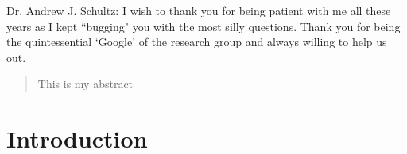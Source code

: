 \documentclass[10pt]{ubthesis}
\begin{document}
\begin{ubfrontmatter}
\begin{acknowledgements}
    \noindent Dr. Andrew J. Schultz: I wish to thank you for being patient with me all these years as I kept ``bugging" you with the most silly questions. Thank you for being the quintessential `Google' of the research group and always willing to help us out. 
\end{acknowledgements}
\tableofcontents
\cleardoublepage
\listoffigures
\cleardoublepage
\listoftables
\cleardoublepage
\begin{abstract}
This is my abstract
\end{abstract}
\end{ubfrontmatter}

\chapter{Introduction}

\begin{ubbackmatter}
\end{ubbackmatter}
\end{document}
